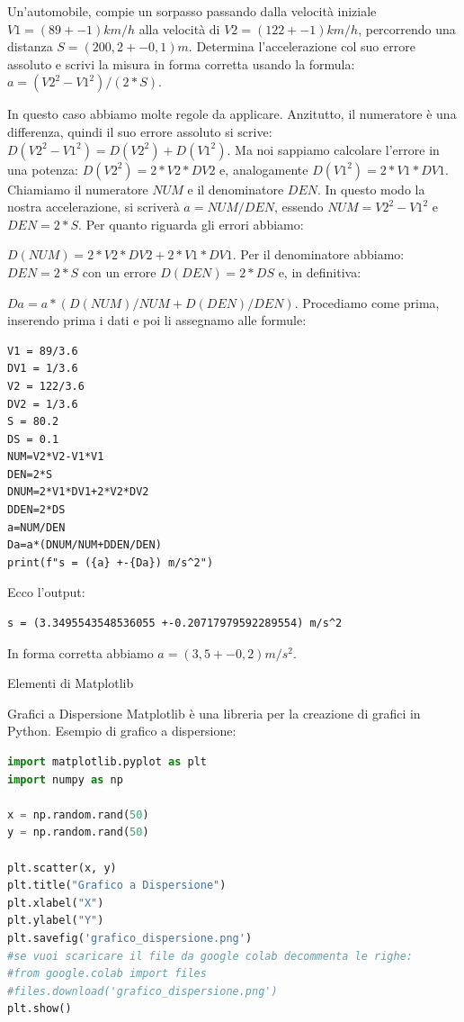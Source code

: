 \documentclass[12pt,a4paper,oneside]{book}
\makeatletter
\newcounter{testexample} %
\renewcommand{\section}{\@startsection{section}{1}{\z@}
{-4ex \@plus -1ex \@minus -.4ex}
{1ex \@plus.2ex }
{\normalfont\large\sffamily\bfseries}}
\renewcommand{\subsection}{\@startsection {subsection}{2}{\z@}
{-3ex \@plus -0.1ex \@minus -.4ex}
{0.5ex \@plus.2ex }
{\color[rgb]{0.141,0.596,0.749}\normalfont\sffamily\bfseries}}
\theoremstyle{esercizio}
\makeatother
\begin{document}
\begin{testexample}

Un'automobile, compie un sorpasso passando dalla velocità iniziale $V1=(89 +-1 )km/h$ alla velocità di $V2=(122 +-1) km/h$, percorrendo una distanza $S = (200,2 +- 0,1 ) m$.  Determina l'accelerazione col suo errore assoluto e scrivi la misura in forma corretta usando la formula: $a = (V2^2 -V1^2)/(2*S)$.

In questo caso abbiamo molte regole da applicare. Anzitutto, il numeratore è una differenza, quindi il suo errore assoluto si scrive: $D(V2^2-V1^2)=D(V2^2) +D(V1^2)$. Ma noi sappiamo calcolare l'errore in una potenza: $D(V2^2) = 2*V2*DV2$ e, analogamente $D(V1^2)=2*V1*DV1$. Chiamiamo il numeratore $NUM$ e il denominatore $DEN$. In questo modo la nostra accelerazione, si scriverà $a = NUM/DEN$, essendo $NUM=V2^2 -V1^2$ e $DEN = 2*S$. Per quanto riguarda gli errori abbiamo:

$D(NUM) = 2*V2*DV2 +2*V1*DV1$. Per il denominatore abbiamo: $DEN = 2*S$ con un errore $D(DEN)= 2*DS$ e, in definitiva:

$Da = a*(D(NUM)/NUM +D(DEN)/DEN)$. Procediamo come prima, inserendo prima i dati e poi li assegnamo alle formule:

\begin{verbatim}
V1 = 89/3.6
DV1 = 1/3.6
V2 = 122/3.6
DV2 = 1/3.6
S = 80.2
DS = 0.1
NUM=V2*V2-V1*V1
DEN=2*S
DNUM=2*V1*DV1+2*V2*DV2
DDEN=2*DS
a=NUM/DEN
Da=a*(DNUM/NUM+DDEN/DEN)
print(f"s = ({a} +-{Da}) m/s^2")
\end{verbatim}
Ecco l'output:
\begin{verbatim}
s = (3.3495543548536055 +-0.20717979592289554) m/s^2
\end{verbatim}
In forma corretta abbiamo $a = ( 3,5 +- 0,2) m/s^2$.



\end{testexample}


\section{Elementi di Matplotlib}

\subsection{Grafici a Dispersione}
Matplotlib è una libreria per la creazione di grafici in Python. Esempio di grafico a dispersione:
\begin{lstlisting}[language=Python]
import matplotlib.pyplot as plt
import numpy as np

x = np.random.rand(50)
y = np.random.rand(50)

plt.scatter(x, y)
plt.title("Grafico a Dispersione")
plt.xlabel("X")
plt.ylabel("Y")
plt.savefig('grafico_dispersione.png')
#se vuoi scaricare il file da google colab decommenta le righe:
#from google.colab import files
#files.download('grafico_dispersione.png')
plt.show()
\end{lstlisting}
\end{document}
